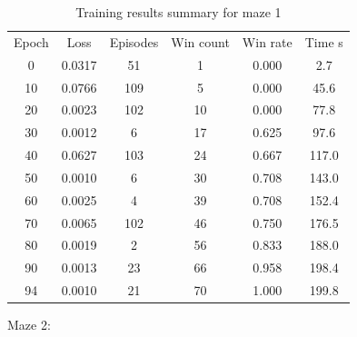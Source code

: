 \documentclass[a4paper]{article}    %
\begin{document}
\begin{table}[H]
    \begin{center}
        \begin{tabular}{|c|c|c|c|c|c|}
            \cline{1-6}
            \rowcolor{Gray}
            Epoch & Loss & Episodes & Win count & Win rate & Time s \\
            \cline{1-6}
             0 & 0.0317 &  51 &  1 & 0.000 &   2.7 \\
            10 & 0.0766 & 109 &  5 & 0.000 &  45.6 \\
            20 & 0.0023 & 102 & 10 & 0.000 &  77.8 \\
            30 & 0.0012 &   6 & 17 & 0.625 &  97.6 \\
            40 & 0.0627 & 103 & 24 & 0.667 & 117.0 \\
            50 & 0.0010 &   6 & 30 & 0.708 & 143.0 \\
            60 & 0.0025 &   4 & 39 & 0.708 & 152.4 \\
            70 & 0.0065 & 102 & 46 & 0.750 & 176.5 \\
            80 & 0.0019 &   2 & 56 & 0.833 & 188.0 \\
            90 & 0.0013 &  23 & 66 & 0.958 & 198.4 \\
            94 & 0.0010 &  21 & 70 & 1.000 & 199.8 \\
            \cline{1-6}
        \end{tabular}
    \end{center}
    \caption{Training results summary for maze 1}
    \label{tab:maze1-results}
\end{table}



Maze 2:
\end{document}
